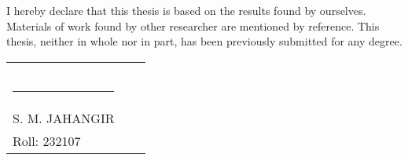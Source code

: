 I hereby declare that this thesis is based on the results found by ourselves. Materials
of work found by other researcher are mentioned by reference. This thesis, neither in
whole nor in part, has been previously submitted for any degree.

\bigskip
\bigskip
\bigskip


\begin{tabular}{p{5cm}p{5cm}p{5cm}}
\centering
     &  &   \\
     &  &   \\
     &  &   \\
  \rule{3.5cm}{1pt} & \rule{3.5cm}{1pt} & \rule{3.5cm}{1pt}\\
  S. M. JAHANGIR \\
  Roll: 232107\\

\end{tabular}

